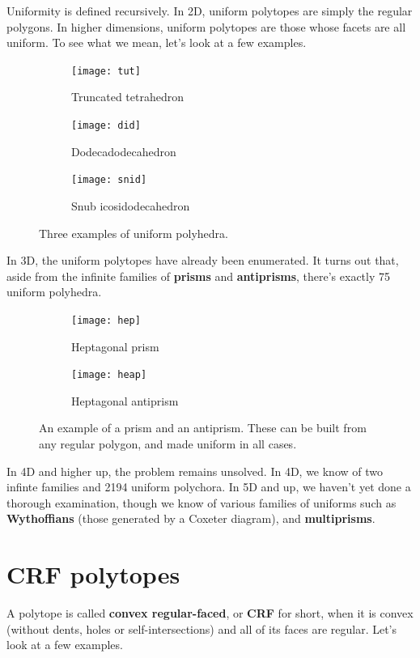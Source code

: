\documentclass{article}
\begin{document}
Uniformity is defined recursively. In 2D, uniform polytopes are simply the regular polygons.
In higher dimensions, uniform polytopes are those whose facets are all uniform. To see what we mean, let's look at a few examples.

\begin{figure}[H]
  \centering
  \begin{subfigure}{.33333\textwidth}
    \centering
    \texttt{[image: tut]}
    \caption{Truncated tetrahedron}
    \label{fig:tut}
  \end{subfigure}%
  \begin{subfigure}{.33333\textwidth}
    \centering
    \texttt{[image: did]}
    \caption{Dodecadodecahedron}
    \label{fig:did}
  \end{subfigure}%
  \begin{subfigure}{.33333\textwidth}
    \centering
    \texttt{[image: snid]}
    \caption{Snub icosidodecahedron}
    \label{fig:snid}
  \end{subfigure}%
  \caption{Three examples of uniform polyhedra.}
  \label{fig:uniforms3D}
\end{figure}

In 3D, the uniform polytopes have already been enumerated. It turns out that, aside from the infinite families of \textbf{prisms} and \textbf{antiprisms}, there's exactly 75 uniform polyhedra.

\begin{figure}[H]
  \centering
  \begin{subfigure}{.5\textwidth}
    \centering
    \texttt{[image: hep]}
    \caption{Heptagonal prism}
    \label{fig:hep}
  \end{subfigure}%
  \begin{subfigure}{.5\textwidth}
    \centering
    \texttt{[image: heap]}
    \caption{Heptagonal antiprism}
    \label{fig:heap}
  \end{subfigure}%
  \caption{An example of a prism and an antiprism. These can be built from any regular polygon, and made uniform in all cases.}
  \label{fig:prisms}
\end{figure}

In 4D and higher up, the problem remains unsolved. In 4D, we know of two infinte families and 2194 uniform polychora. In 5D and up, we haven't yet done a thorough examination, though we know of various families of uniforms such as \textbf{Wythoffians} (those generated by a Coxeter diagram), and \textbf{multiprisms}.

\section{CRF polytopes}
A polytope is called \textbf{convex regular-faced}, or \textbf{CRF} for short, when it is convex (without dents, holes or self-intersections) and all of its faces are regular. Let's look at a few examples.
\end{document}
